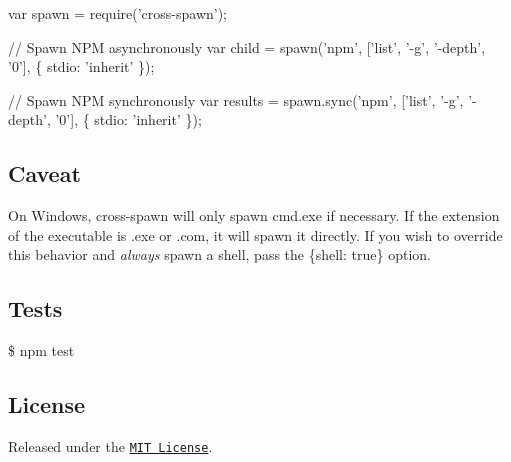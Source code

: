 \begin{DoxyCode}
var spawn = require('cross-spawn');

// Spawn NPM asynchronously
var child = spawn('npm', ['list', '-g', '-depth', '0'], \{ stdio: 'inherit' \});

// Spawn NPM synchronously
var results = spawn.sync('npm', ['list', '-g', '-depth', '0'], \{ stdio: 'inherit' \});
\end{DoxyCode}


\subsection*{Caveat}

On Windows, cross-\/spawn will only spawn {\ttfamily cmd.\+exe} if necessary. If the extension of the executable is {\ttfamily .exe} or {\ttfamily .com}, it will spawn it directly. If you wish to override this behavior and {\itshape always} spawn a shell, pass the {\ttfamily \{shell\+: true\}} option.

\subsection*{Tests}

{\ttfamily \$ npm test}

\subsection*{License}

Released under the \href{http://www.opensource.org/licenses/mit-license.php}{\tt M\+IT License}. 